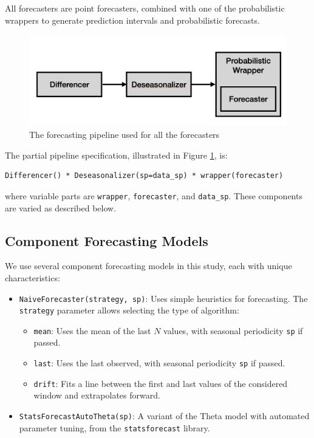 All forecasters are point forecasters, combined with one of the probabilistic wrappers to generate prediction intervals and probabilistic forecasts.

\begin{figure}
    \centering
    \includegraphics[width=\textwidth]{Figures/Pipeline.png}
    \caption{The forecasting pipeline used for all the forecasters}
    \label{fig:pipeline}
\end{figure}

The partial pipeline specification, illustrated in Figure \ref{fig:pipeline}, is:

\begin{verbatim}
Differencer() * Deseasonalizer(sp=data_sp) * wrapper(forecaster)
\end{verbatim}

where variable parts are \texttt{wrapper}, \texttt{forecaster}, and \texttt{data\_sp}. These components are varied as described below.

\subsection{Component Forecasting Models}

We use several component forecasting models in this study, each with unique characteristics:

\begin{itemize}
    \item \texttt{NaiveForecaster(strategy, sp)}: Uses simple heuristics for forecasting. The \texttt{strategy} parameter allows selecting the type of algorithm:
    \begin{itemize}
        \item \texttt{mean}: Uses the mean of the last \(N\) values, with seasonal periodicity \texttt{sp} if passed.
        \item \texttt{last}: Uses the last observed, with seasonal periodicity \texttt{sp} if passed.
        \item \texttt{drift}: Fits a line between the first and last values of the considered window and extrapolates forward.
    \end{itemize}

    \item \texttt{StatsForecastAutoTheta(sp)}: A variant of the Theta model \cite{Assimakopoulos2000} with automated parameter tuning, from the \texttt{statsforecast} library.
    
\end{itemize}

